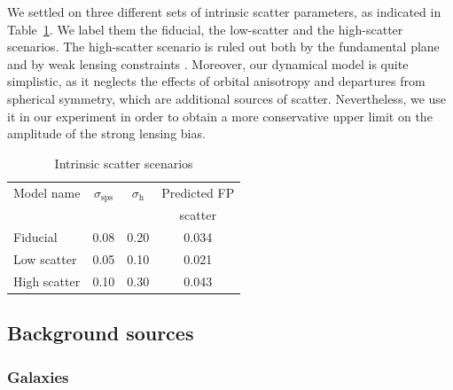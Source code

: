 \documentclass{aa}
\def\Tref#1{Table~\ref{#1}\xspace}
\begin{document}
We settled on three different sets of intrinsic scatter parameters, as indicated in \Tref{tab:scatter}. We label them the fiducial, the low-scatter and the high-scatter scenarios.
The high-scatter scenario is ruled out both by the fundamental plane and by weak lensing constraints \citep{Son++22}. 
Moreover, our dynamical model is quite simplistic, as it neglects the effects of orbital anisotropy and departures from spherical symmetry, which are additional sources of scatter. 
Nevertheless, we use it in our experiment in order to obtain a more conservative upper limit on the amplitude of the strong lensing bias.
\begin{table}
\caption{Intrinsic scatter scenarios}
\label{tab:scatter}
\begin{tabular}{lccc}
\hline
\hline
Model name & $\sigma_{\mathrm{sps}}$ & $\sigma_{\mathrm{h}}$ & Predicted FP \\
 & & & scatter \\
\hline
Fiducial & 0.08 & 0.20 & 0.034 \\
Low scatter & 0.05 & 0.10 & 0.021 \\
High scatter & 0.10 & 0.30 & 0.043 \\
\end{tabular}
\end{table}

\subsection{Background sources}\label{ssec:sources}

\subsubsection{Galaxies}\label{ssub:extsources}
\end{document}
